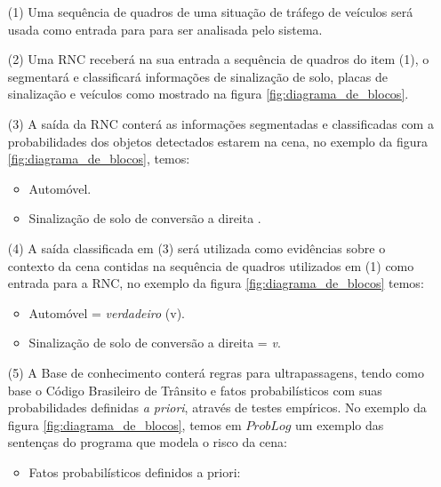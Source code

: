 \documentclass[
	12pt,				%
    oneside,			%
	a4paper,			%
	english,			%
	french,				%
	spanish,			%
	brazil,				%
	]{abntex2}
\begin{document}
\begin{enumerate}
    

    \item[{(1)}] Uma sequência de quadros de uma situação de tráfego de veículos será usada como entrada para para ser analisada pelo sistema.


    \item[{(2)}] Uma RNC receberá na sua entrada a sequência de quadros do item (1), o segmentará e classificará informações de sinalização de solo, placas de sinalização e veículos como mostrado na figura \ref{fig:diagrama_de_blocos}.


    \item[{(3)}] A saída da RNC conterá as informações segmentadas e classificadas com a probabilidades dos objetos detectados estarem na cena, no exemplo da figura \ref{fig:diagrama_de_blocos}, temos:
        \begin{itemize}
            \item Automóvel.
            \item Sinalização de solo de conversão a direita . 
        \end{itemize}
        
    \item[{(4)}] A saída classificada em (3) será utilizada como evidências sobre o contexto da cena contidas na sequência de quadros utilizados em (1) como entrada para a RNC, no exemplo da figura \ref{fig:diagrama_de_blocos} temos:
        \begin{itemize}
            \item Automóvel = \textit{verdadeiro} (v).
            \item Sinalização de solo de conversão a direita  = \textit{v}.
        \end{itemize}    
        

    \item[{(5)}] A Base de conhecimento conterá regras para ultrapassagens, tendo como base o Código Brasileiro de Trânsito e fatos probabilísticos com suas probabilidades definidas \textit{a priori}, através de testes empíricos. No exemplo da figura \ref{fig:diagrama_de_blocos}, temos em $ProbLog$ um exemplo das sentenças do programa que modela o risco da cena:
        \begin{itemize}
        
            \item Fatos probabilísticos definidos a priori:\newline
            

\end{itemize}
\end{enumerate}
\end{document}
